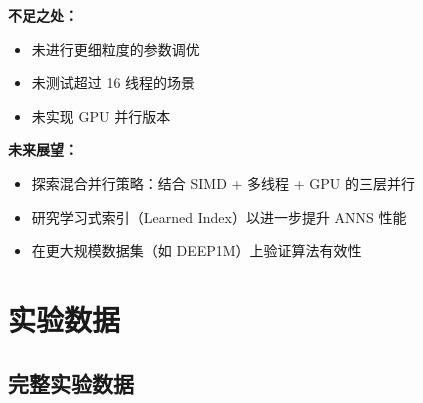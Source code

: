 \documentclass[a4paper]{article}
\begin{document}
\textbf{不足之处：}
\begin{itemize}
\item 未进行更细粒度的参数调优
\item 未测试超过 16 线程的场景
\item 未实现 GPU 并行版本
\end{itemize}

\textbf{未来展望：}
\begin{itemize}
\item 探索混合并行策略：结合 SIMD + 多线程 + GPU 的三层并行
\item 研究学习式索引（Learned Index）以进一步提升 ANNS 性能
\item 在更大规模数据集（如 DEEP1M）上验证算法有效性
\end{itemize}

\appendix
\section{实验数据}

\subsection{完整实验数据}
\end{document}
